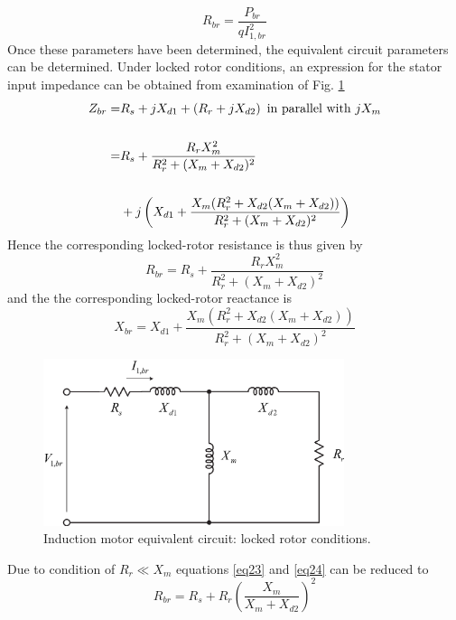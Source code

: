 \documentclass[11pt,a4paper,oneside]{book}
\numberwithin{equation}{section}
\theoremstyle{it}
\theoremstyle{definition}
\begin{document}
\begin{equation} \label{eq21}
	R_{br} = \frac{P_{br}}{qI_{1,br}^2}
\end{equation} 
Once these parameters have been determined, the equivalent circuit parameters can be determined. Under locked rotor conditions, an expression for the stator input impedance can be obtained from examination of Fig. \ref{figure:rotor_locked}
\begin{equation} \label{eq22}
	\begin{split}
		Z_{br} 	= & R_s + jX_{d1} + \left( R_r + j X_{d2} \right) \textmd{ in parallel with } jX_m   \\\\
		= & R_s + \frac{R_rX_m^2}{R_r^2+(X_m+X_{d2})^2} \\\\
		& + j \left(X_{d1} + \frac{X_m(R_r^2+X_{d2}(X_m+X_{d2}))}{R_r^2+(X_m+X_{d2})^2}\right) \\
	\end{split}
\end{equation}
Hence the corresponding locked-rotor resistance is thus given by
\begin{equation} \label{eq23}
	R_{br} = R_s + \frac{R_rX_m^2}{R_r^2+(X_m+X_{d2})^2} 
\end{equation} 
and the the corresponding locked-rotor reactance is
\begin{equation} \label{eq24}
	X_{br} = X_{d1} + \frac{X_m(R_r^2+X_{d2}(X_m+X_{d2}))}{R_r^2+(X_m+X_{d2})^2}
\end{equation} 
\begin{figure}[htbp]
	\centering
	\includegraphics[width = 250pt, keepaspectratio]{figures/rotor_locked_test.eps}
	\captionsetup{width=0.5\textwidth}		
	\caption{Induction motor equivalent circuit: locked rotor conditions.}
	\label{figure:rotor_locked} 
\end{figure}
Due to condition of $R_r \ll X_m$ equations \ref{eq23} and \ref{eq24} can be reduced to
\begin{equation} \label{eq25}
	R_{br} = R_s + R_r \left(\frac{X_m}{X_m+X_{d2}}\right)^2
\end{equation} 
\end{document}
